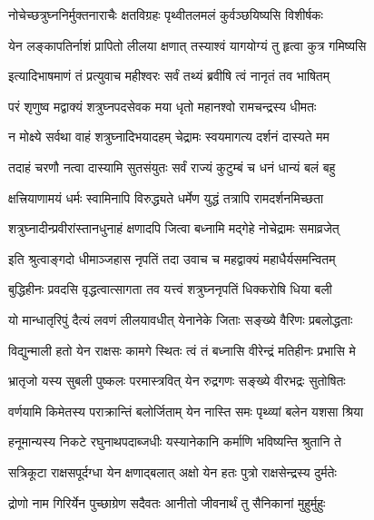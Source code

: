 \twolineshloka
{नोचेच्छत्रुघ्ननिर्मुक्तनाराचैः क्षतविग्रहः}
{पृथ्वीतलमलं कुर्वञ्छयिष्यसि विशीर्षकः}%

\twolineshloka
{येन लङ्कापतिर्नाशं प्रापितो लीलया क्षणात्}
{तस्याश्वं यागयोग्यं तु हृत्वा कुत्र गमिष्यसि}%


\twolineshloka
{इत्यादिभाषमाणं तं प्रत्युवाच महीश्वरः}
{सर्वं तथ्यं ब्रवीषि त्वं नानृतं तव भाषितम्}%

\twolineshloka
{परं शृणुष्व मद्वाक्यं शत्रुघ्नपदसेवक}
{मया धृतो महानश्वो रामचन्द्रस्य धीमतः}%

\twolineshloka
{न मोक्ष्ये सर्वथा वाहं शत्रुघ्नादिभयादहम्}
{चेद्रामः स्वयमागत्य दर्शनं दास्यते मम}%

\twolineshloka
{तदाहं चरणौ नत्वा दास्यामि सुतसंयुतः}
{सर्वं राज्यं कुटुम्बं च धनं धान्यं बलं बहु}%

\twolineshloka
{क्षत्त्रियाणामयं धर्मः स्वामिनापि विरुद्ध्यते}
{धर्मेण युद्धं तत्रापि रामदर्शनमिच्छता}%

\twolineshloka
{शत्रुघ्नादीन्प्रवीरांस्तानधुनाहं क्षणादपि}
{जित्वा बध्नामि मद्गेहे नोचेद्रामः समाव्रजेत्}%


\twolineshloka
{इति श्रुत्वाङ्गदो धीमाञ्जहास नृपतिं तदा}
{उवाच च महद्वाक्यं महाधैर्यसमन्वितम्}%


\twolineshloka
{बुद्धिहीनः प्रवदसि वृद्धत्वात्सागता तव}
{यत्त्वं शत्रुघ्ननृपतिं धिक्करोषि धिया बली}%

\twolineshloka
{यो मान्धातृरिपुं दैत्यं लवणं लीलयावधीत्}
{येनानेके जिताः सङ्ख्ये वैरिणः प्रबलोद्धताः}%

\twolineshloka
{विद्युन्माली हतो येन राक्षसः कामगे स्थितः}
{त्वं तं बध्नासि वीरेन्द्रं मतिहीनः प्रभासि मे}%

\twolineshloka
{भ्रातृजो यस्य सुबली पुष्कलः परमास्त्रवित्}
{येन रुद्रगणः सङ्ख्ये वीरभद्रः सुतोषितः}%

\twolineshloka
{वर्णयामि किमेतस्य पराक्रान्तिं बलोर्जिताम्}
{येन नास्ति समः पृथ्व्यां बलेन यशसा श्रिया}%

\twolineshloka
{हनूमान्यस्य निकटे रघुनाथपदाब्जधीः}
{यस्यानेकानि कर्माणि भविष्यन्ति श्रुतानि ते}%

\twolineshloka
{सत्रिकूटा राक्षसपूर्दग्धा येन क्षणाद्बलात्}
{अक्षो येन हतः पुत्रो राक्षसेन्द्रस्य दुर्मतेः}%

\twolineshloka
{द्रोणो नाम गिरिर्येन पुच्छाग्रेण सदैवतः}
{आनीतो जीवनार्थं तु सैनिकानां मुहुर्मुहुः}%

